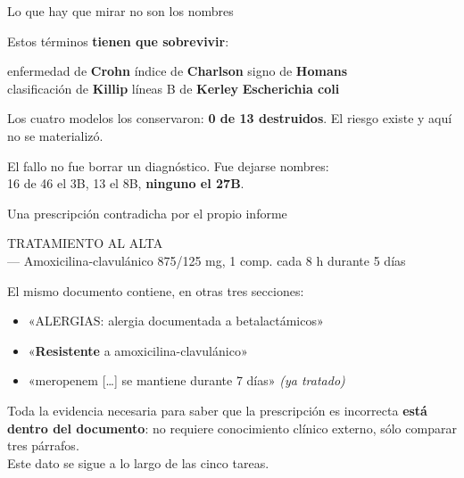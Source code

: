\documentclass[aspectratio=169,11pt]{beamer}
\newcommand{\bien}[1]{\textcolor{bueno}{\textbf{#1}}}
\begin{document}
\begin{frame}{Lo que hay que mirar no son los nombres}
  \begin{center}\large Estos términos \textbf{tienen que sobrevivir}:\end{center}
  \vspace{.5em}
  \begin{center}\large
  enfermedad de \textbf{Crohn} \quad índice de \textbf{Charlson} \quad signo de \textbf{Homans}\\[.3em]
  clasificación de \textbf{Killip} \quad líneas B de \textbf{Kerley} \quad \textbf{Escherichia coli}
  \end{center}
  \vspace{.8em}
  \begin{center}\small
  Los cuatro modelos los conservaron: \bien{0 de 13 destruidos}. El riesgo
  existe y aquí no se materializó.
  \end{center}
  \pause
  \vspace{.6em}
  \begin{center}
  \alert{\large El fallo no fue borrar un diagnóstico. Fue dejarse nombres:}\\[.2em]
  \alert{\large 16 de 46 el 3B, 13 el 8B, \bien{ninguno el 27B}.}
  \end{center}
\end{frame}

\begin{frame}{Una prescripción contradicha por el propio informe}
  \begin{center}
  \colorbox{black!6}{\parbox{.9\linewidth}{\centering\ttfamily\footnotesize
  TRATAMIENTO AL ALTA\\[.2em]
  --- Amoxicilina-clavulánico 875/125 mg, 1 comp. cada 8 h durante 5 días}}
  \end{center}
  \vspace{.8em}
  El mismo documento contiene, en otras tres secciones:
  \vspace{.4em}
  \begin{itemize}\small
    \item «ALERGIAS: alergia documentada a betalactámicos»
    \item «\textbf{Resistente} a amoxicilina-clavulánico»
    \item «meropenem [\ldots] se mantiene durante 7 días» \emph{(ya tratado)}
  \end{itemize}
  \vspace{.5em}
  \begin{center}\small
  Toda la evidencia necesaria para saber que la prescripción es incorrecta
  \textbf{está dentro del documento}: no requiere conocimiento clínico externo,
  sólo comparar tres párrafos.\\[.3em]
  Este dato se sigue a lo largo de las cinco tareas.
  \end{center}
\end{frame}
\end{document}
